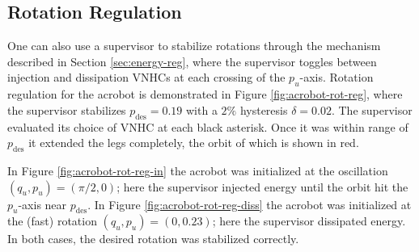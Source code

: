 \documentclass[journal,twoside,web, twocolumn,draftcls]{ieeecolor}
\begin{document}
\subsection{Rotation Regulation}
One can also use a supervisor to stabilize rotations through the mechanism
described in Section \ref{sec:energy-reg}, where the supervisor toggles between
injection and dissipation VNHCs at each crossing of the \(p_u\)-axis.
Rotation regulation for the acrobot is demonstrated in 
Figure \ref{fig:acrobot-rot-reg}, where the supervisor stabilizes 
\(p_\text{des} = 0.19\) with a \(2\%\) hysteresis \(\delta = 0.02\).
The supervisor evaluated its choice of VNHC at each black asterisk.
Once it was within range of \(p_\text{des}\) it extended the legs completely,
the orbit of which is shown in red.

In Figure \ref{fig:acrobot-rot-reg-in} the acrobot was initialized at 
the oscillation \((q_u,p_u) = (\pi/2,0)\); here the supervisor injected energy
until the orbit hit the \(p_u\)-axis near \(p_\text{des}\).
In Figure \ref{fig:acrobot-rot-reg-diss} the acrobot was initialized at the
(fast) rotation \((q_u,p_u) = (0, 0.23)\); here the supervisor dissipated energy.
In both cases, the desired rotation was stabilized correctly.
\end{document}

